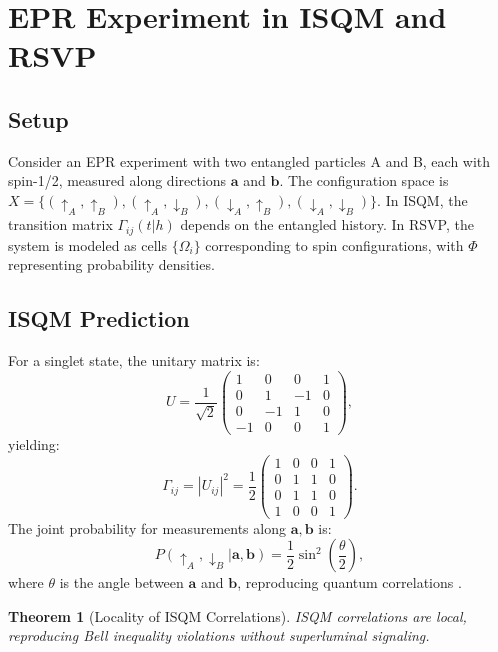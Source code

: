 \documentclass[12pt]{article}
\newtheorem{theorem}{Theorem}
\begin{document}
{\section{EPR Experiment in ISQM and RSVP}

\subsection{Setup}

Consider an EPR experiment with two entangled particles A and B, each with spin-1/2, measured along directions \(\mathbf{a}\) and \(\mathbf{b}\). The configuration space is \(X = \{ (\uparrow_A, \uparrow_B), (\uparrow_A, \downarrow_B), (\downarrow_A, \uparrow_B), (\downarrow_A, \downarrow_B) \}\). In ISQM, the transition matrix \(\Gamma_{ij}(t | h)\) depends on the entangled history. In RSVP, the system is modeled as cells \(\{\Omega_i\}\) corresponding to spin configurations, with \(\Phi\) representing probability densities.

\subsection{ISQM Prediction}

For a singlet state, the unitary matrix is:
\[
U = \frac{1}{\sqrt{2}} \begin{pmatrix} 1 & 0 & 0 & 1 \\ 0 & 1 & -1 & 0 \\ 0 & -1 & 1 & 0 \\ -1 & 0 & 0 & 1 \end{pmatrix},
\]
yielding:
\[
\Gamma_{ij} = |U_{ij}|^2 = \frac{1}{2} \begin{pmatrix} 1 & 0 & 0 & 1 \\ 0 & 1 & 1 & 0 \\ 0 & 1 & 1 & 0 \\ 1 & 0 & 0 & 1 \end{pmatrix}.
\]
The joint probability for measurements along \(\mathbf{a}, \mathbf{b}\) is:
\[
P(\uparrow_A, \downarrow_B | \mathbf{a}, \mathbf{b}) = \frac{1}{2} \sin^2 \left( \frac{\theta}{2} \right),
\]
where \(\theta\) is the angle between \(\mathbf{a}\) and \(\mathbf{b}\), reproducing quantum correlations \cite{Barandes2023}.

\begin{theorem}[Locality of ISQM Correlations]
\label{thm:locality}
ISQM correlations are local, reproducing Bell inequality violations without superluminal signaling.
\end{theorem}

}
\end{document}
